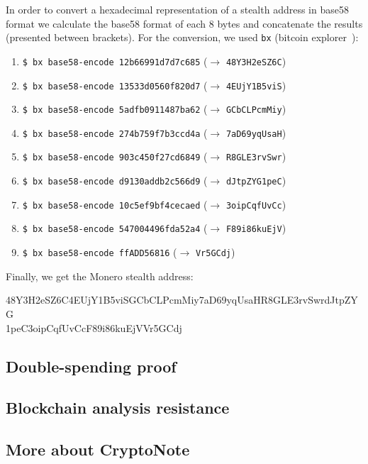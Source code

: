 In order to convert a hexadecimal representation of a stealth address in base58 format we calculate the base58 format of each 8 bytes and concatenate the results (presented between brackets). For the conversion, we used \verb|bx| (bitcoin explorer~\cite{bx}):

\begin{enumerate}
  \item \verb|$ bx base58-encode 12b66991d7d7c685| ($\rightarrow$ \verb|48Y3H2eSZ6C|)
  \item \verb|$ bx base58-encode 13533d0560f820d7| ($\rightarrow$ \verb|4EUjY1B5viS|)
  \item \verb|$ bx base58-encode 5adfb0911487ba62| ($\rightarrow$ \verb|GCbCLPcmMiy|)
  \item \verb|$ bx base58-encode 274b759f7b3ccd4a| ($\rightarrow$ \verb|7aD69yqUsaH|)
  \item \verb|$ bx base58-encode 903c450f27cd6849| ($\rightarrow$ \verb|R8GLE3rvSwr|)
  \item \verb|$ bx base58-encode d9130addb2c566d9| ($\rightarrow$ \verb|dJtpZYG1peC|)
  \item \verb|$ bx base58-encode 10c5ef9bf4cecaed| ($\rightarrow$ \verb|3oipCqfUvCc|)
  \item \verb|$ bx base58-encode 547004496fda52a4| ($\rightarrow$ \verb|F89i86kuEjV|)
  \item \verb|$ bx base58-encode ffADD56816| ($\rightarrow$ \verb|Vr5GCdj|)
\end{enumerate}

Finally, we get the Monero stealth address:
\begin{tcolorbox}[colback=green!5!white,colframe=green!65!black]
  \small{48Y3H2eSZ6C4EUjY1B5viSGCbCLPcmMiy7aD69yqUsaHR8GLE3rvSwrdJtpZYG\\
  1peC3oipCqfUvCcF89i86kuEjVVr5GCdj}
\end{tcolorbox}


\subsection{Double-spending proof}
\subsection{Blockchain analysis resistance}
\subsection{More about CryptoNote}

